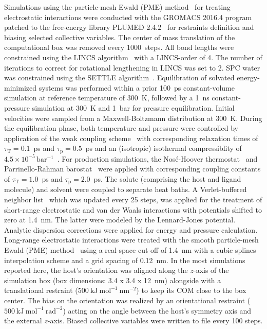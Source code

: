 \documentclass[9pt,lessons]{livecoms}
\begin{document}
Simulations using the particle-mesh Ewald (PME) method~\cite{darden1993particle, essmann1995smooth} for treating electrostatic interactions were conducted with the 
GROMACS 2016.4 program~\cite{berendsen1995gromacs, hess2008gromacs, abraham2015gromacs} patched to the free-energy library 
PLUMED 2.4.2~\cite{tribello2014plumed} for restraints definition and biasing selected collective variables.
The center of mass translation of the computational box was removed every 1000~steps. 
All bond lengths were constrained using the LINCS algorithm~\cite{hess1997lincs, hess2008p} with a LINCS-order of 4. 
The number of iterations to correct for rotational lengthening in LINCS was set to 2.
SPC water was constrained using the SETTLE algorithm~\cite{miyamoto1992settle}.
Equilibration of solvated energy-minimized systems was performed within a prior 100~ps constant-volume simulation at reference temperature of 300~K, followed by a 1~ns constant-pressure simulation at 300~K and 1~bar for pressure equilibration.
Initial velocities were sampled from a Maxwell-Boltzmann distribution at 300~K.
During the equilibration phase, both temperature and pressure were controlled by application of the weak coupling scheme~\cite{berendsen1984molecular} with corresponding relaxation times of 
$\tau_\mathrm{T} = 0.1$~ps and $\tau_\mathrm{p} = 0.5$~ps and an (isotropic) isothermal compressiblity of $4.5\times 10^{-5}\,\mathrm{bar^{-1}}$~\cite{kell1967precise}.
For production simulations, the Nos\'{e}-Hoover thermostat~\cite{nose1984molecular, hoover1985canonical, martyna1996explicit} and Parrinello-Rahman barostat~\cite{parrinello1981polymorphic, nose1983constant} were applied with corresponding coupling constants of $\tau_\mathrm{T} = 1.0$~ps and $\tau_\mathrm{p} = 2.0$~ps.
The solute (comprising the host and ligand molecule) and solvent were coupled to separate heat baths.
A Verlet-buffered neighbor list~\cite{pall2013flexible} which was updated every 25 steps, was applied for the treatment of short-range electrostatic and van der Waals interactions with potentials shifted to zero at 1.4~nm. 
The latter were modeled by the Lennard-Jones potential.
Analytic dispersion corrections were applied for energy and pressure calculation.
Long-range electrostatic interactions were treated with the smooth particle-mesh Ewald (PME) method~\cite{darden1993particle, essmann1995smooth} using a real-space cut-off of 1.4~nm with a cubic splines interpolation scheme and a grid spacing of 0.12~nm.
In the most simulations reported here, the host's orientation was aligned along the $z$-axis of the simulation box (box dimensions: 3.4 x 3.4 x 12~nm) alongside with a translational 
restraint ($500~\mathrm{kJ~mol}^{-1}~\mathrm{nm}^{-2}$) to keep its COM close to the box center.
The bias on the orientation was realized by an orientational restraint ($500~\mathrm{kJ~mol^{-1}~rad^{-2}}$) acting on the angle between the host's symmetry axis and the external $z$-axis.
Biased collective variables were written to file every 100 steps.
\end{document}
